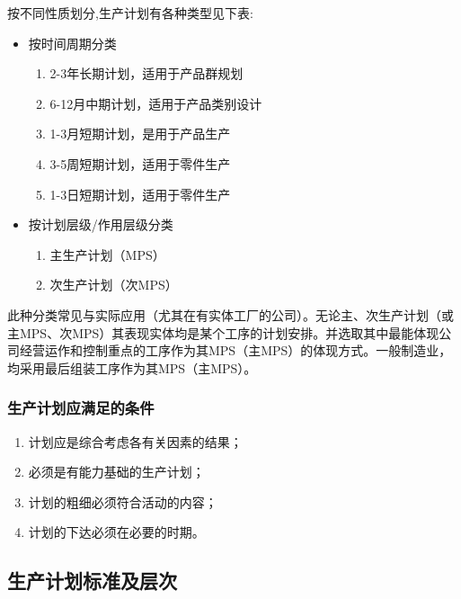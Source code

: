         按不同性质划分,生产计划有各种类型见下表:

            \begin{itemize}
                \item  按时间周期分类
                    \begin{enumerate}
                        \item  2-3年长期计划，适用于产品群规划
                        \item  6-12月中期计划，适用于产品类别设计
                        \item  1-3月短期计划，是用于产品生产
                        \item  3-5周短期计划，适用于零件生产
                        \item  1-3日短期计划，适用于零件生产
                    \end{enumerate}

                \item  按计划层级/作用层级分类
                    \begin{enumerate}
                        \item  主生产计划（MPS）
                        \item  次生产计划（次MPS）
                    \end{enumerate}
            \end{itemize}

            此种分类常见与实际应用（尤其在有实体工厂的公司）。无论主、次生产计划（或主MPS、次MPS）其表现实体均是某个工序的计划安排。并选取其中最能体现公司经营运作和控制重点的工序作为其MPS（主MPS）的体现方式。一般制造业，均采用最后组装工序作为其MPS（主MPS）。

    \subsubsection {生产计划应满足的条件}
        \begin{enumerate}
            \item  计划应是综合考虑各有关因素的结果；
            \item  必须是有能力基础的生产计划；
            \item  计划的粗细必须符合活动的内容；
            \item  计划的下达必须在必要的时期。
        \end{enumerate}

\subsection {生产计划标准及层次}

